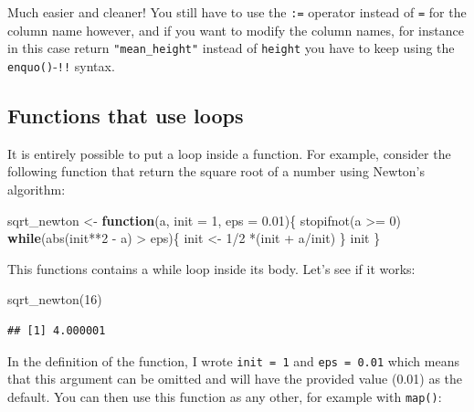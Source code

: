 \documentclass[
]{article}
\newenvironment{Shaded}{\begin{snugshade}}{\end{snugshade}}
\newcommand{\AttributeTok}[1]{\textcolor[rgb]{0.77,0.63,0.00}{#1}}
\newcommand{\ControlFlowTok}[1]{\textcolor[rgb]{0.13,0.29,0.53}{\textbf{#1}}}
\newcommand{\DecValTok}[1]{\textcolor[rgb]{0.00,0.00,0.81}{#1}}
\newcommand{\FloatTok}[1]{\textcolor[rgb]{0.00,0.00,0.81}{#1}}
\newcommand{\FunctionTok}[1]{\textcolor[rgb]{0.00,0.00,0.00}{#1}}
\newcommand{\NormalTok}[1]{#1}
\newcommand{\OtherTok}[1]{\textcolor[rgb]{0.56,0.35,0.01}{#1}}
\newcommand{\SpecialCharTok}[1]{\textcolor[rgb]{0.00,0.00,0.00}{#1}}
\begin{document}
Much easier and cleaner! You still have to use the \texttt{:=} operator instead of \texttt{=} for the column name
however, and if you want to modify the column names, for instance in this
case return \texttt{"mean\_height"} instead of \texttt{height} you have to keep using the \texttt{enquo()}-\texttt{!!} syntax.

\hypertarget{functions-that-use-loops}{%
\subsection{Functions that use loops}\label{functions-that-use-loops}}

It is entirely possible to put a loop inside a function. For example, consider the following
function that return the square root of a number using Newton's algorithm:

\begin{Shaded}
\begin{Highlighting}[]
\NormalTok{sqrt\_newton }\OtherTok{\textless{}{-}} \ControlFlowTok{function}\NormalTok{(a, }\AttributeTok{init =} \DecValTok{1}\NormalTok{, }\AttributeTok{eps =} \FloatTok{0.01}\NormalTok{)\{}
    \FunctionTok{stopifnot}\NormalTok{(a }\SpecialCharTok{\textgreater{}=} \DecValTok{0}\NormalTok{)}
    \ControlFlowTok{while}\NormalTok{(}\FunctionTok{abs}\NormalTok{(init}\SpecialCharTok{**}\DecValTok{2} \SpecialCharTok{{-}}\NormalTok{ a) }\SpecialCharTok{\textgreater{}}\NormalTok{ eps)\{}
\NormalTok{        init }\OtherTok{\textless{}{-}} \DecValTok{1}\SpecialCharTok{/}\DecValTok{2} \SpecialCharTok{*}\NormalTok{(init }\SpecialCharTok{+}\NormalTok{ a}\SpecialCharTok{/}\NormalTok{init)}
\NormalTok{    \}}
\NormalTok{    init}
\NormalTok{\}}
\end{Highlighting}
\end{Shaded}

This functions contains a while loop inside its body. Let's see if it works:

\begin{Shaded}
\begin{Highlighting}[]
\FunctionTok{sqrt\_newton}\NormalTok{(}\DecValTok{16}\NormalTok{)}
\end{Highlighting}
\end{Shaded}

\begin{verbatim}
## [1] 4.000001
\end{verbatim}

In the definition of the function, I wrote \texttt{init\ =\ 1} and \texttt{eps\ =\ 0.01} which means that this
argument can be omitted and will have the provided value (0.01) as the default. You can then use
this function as any other, for example with \texttt{map()}:
\end{document}
